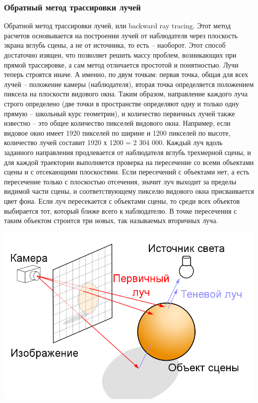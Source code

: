 \subsubsection{Обратный метод трассировки лучей}
Обратной метод трассировки лучей, или backward ray tracing. Этот метод расчетов основывается на построении лучей от наблюдателя через плоскость экрана вглубь сцены, а не от источника, то есть -- наоборот. Этот способ достаточно изящен, что позволяет решить массу проблем, возникающих при прямой трассировке, а сам метод отличается простотой и понятностью. Лучи теперь строятся иначе. А именно, по двум точкам: первая точка, общая для всех лучей – положение камеры (наблюдателя), вторая точка определяется положением пиксела на плоскости видового окна. Таким образом, направление каждого луча строго определено (две точки в пространстве определяют одну и только одну прямую – школьный курс геометрии), и количество первичных лучей также известно – это общее количество пикселей видового окна. Например, если видовое окно имеет 1920 пикселей по ширине и 1200 пикселей по высоте, количество лучей составит 1920 х 1200 = 2 304 000. Каждый луч
вдоль заданного направления продлевается от наблюдателя вглубь трехмерной сцены, и для каждой траектории выполняется проверка на пересечение со всеми объектами сцены и с отсекающими плоскостями. Если пересечений с объектами нет, а есть пересечение только с плоскостью отсечения, значит луч выходит за пределы видимой части сцены, и соответствующему пикселю видового окна присваивается цвет фона. Если луч пересекается с объектами сцены, то среди всех объектов выбирается тот, который ближе всего к наблюдателю. В точке пересечения с таким объектом строится три новых, так называемых вторичных луча. \par

\begin{center}
\includegraphics[scale=0.5]{imgs/Ray_trace_diagram_rus.png} 
\end{center}

